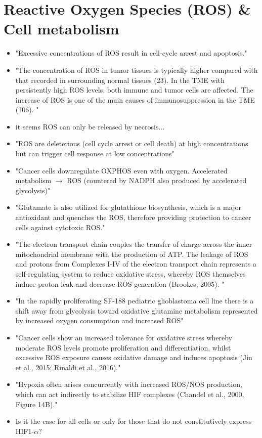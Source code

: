 \documentclass[11pt,a4paper]{article}
\begin{document}
\section{Reactive Oxygen Species (ROS) \& Cell metabolism}
\begin{itemize}
\item "Excessive concentrations of ROS result in cell‐cycle arrest and apoptosis." \cite{Nakamura2021}
\item "The concentration of ROS in tumor tissues is typically higher compared with that recorded in surrounding normal tissues (23). In the TME with persistently high ROS levels, both immune and tumor cells are affected. The increase of ROS is one of the main causes of immunosuppression in the TME (106). "\cite{Liang2021}
\item it seems ROS can only be released by necrosis...
\item "ROS are deleterious (cell cycle arrest or cell death) at high concentrations but can trigger cell response at low concentrations" \cite{Arfin2021}
\item "Cancer cells downregulate OXPHOS even with oxygen. Accelerated metabolism $\rightarrow$ ROS (countered by NADPH also produced by accelerated glycolysis)"\cite{Arfin2021}
\item "Glutamate is also utilized for glutathione biosynthesis, which is a major antioxidant and quenches the ROS, therefore providing protection to cancer cells against cytotoxic ROS."\cite{Mudassar2020}
\item "The electron transport chain couples the transfer of charge across the inner mitochondrial membrane with the production of ATP. The leakage of ROS and protons from Complexes I-IV of the electron transport chain represents a self-regulating system to reduce oxidative stress, whereby ROS themselves induce proton leak and decrease ROS generation (Brookes, 2005). "\cite{Strickland2017}

\item "In the rapidly proliferating SF-188 pediatric glioblastoma cell line there is a shift away from glycolysis toward oxidative glutamine metabolism represented by increased oxygen consumption and increased ROS"\cite{Strickland2017}

\item "Cancer cells show an increased tolerance for oxidative stress whereby moderate ROS levels promote proliferation and differentiation, whilst excessive ROS exposure causes oxidative damage and induces apoptosis (Jin et al., 2015; Rinaldi et al., 2016)."\cite{Strickland2017} 

\item "Hypoxia often arises concurrently with increased ROS/NOS production, which can act indirectly to stabilize HIF complexes (Chandel et al., 2000, Figure 14B)."\cite{Strickland2017} 
\item Is it the case for all cells or only for those that do not constitutively express HIF1-$\alpha ?$
\end{itemize}
\end{document}

